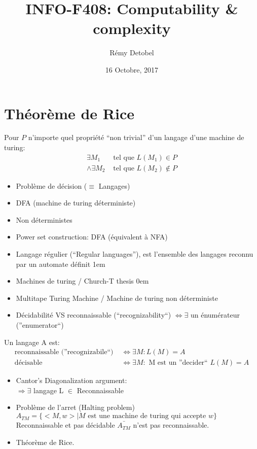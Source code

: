 \documentclass[a4paper,12pt]{article}
\title{INFO-F408: Computability \& complexity}
\date{16 Octobre, 2017}
\author{Rémy Detobel}
\begin{document}
\maketitle
\newpage

\section{Théorème de Rice}
  Pour $P$ n'importe quel propriété ``non trivial'' d'un langage d'une machine de turing:
  \begin{align*}
    \exists M_1 &\text{ tel que } L(M_1) \in P\\
    \wedge \exists M_2 &\text{ tel que } L(M_2) \notin P
  \end{align*}

  \begin{itemize}
   \item Problème de décision ($\equiv$ Langages)
   \item DFA (machine de turing déterministe)
   \item Non déterministes
   \item Power set construction: DFA (équivalent à NFA)
   \item Langage régulier (``Regular languages''), est l'ensemble des langages reconnu par un automate définit
   \itemsep1em
   \item Machines de turing / Church-T thesis
   \itemsep0em
   \item Multitape Turing Machine / Machine de turing non déterministe
   \item Décidabilité VS reconnaissable (``recognizability``) $\Leftrightarrow \exists$ un énumérateur (''enumerator``)
  \end{itemize}
  
  Un langage A est:
  \begin{align*}
    \text{reconnaissable (''recognizabile``) } &\Leftrightarrow \exists M: L(M) = A\\
    \text{décisable } &\Leftrightarrow \exists M: \text{ M est un ''decider`` } L(M) = A
  \end{align*}
  
  \begin{itemize}
    \item Cantor's Diagonalization argument:\\
      $\Rightarrow \exists$ langage L $\in$ Reconnaissable
    \item Problème de l'arret (Halting problem)\\
      $A_{TM} = \{<M, w> | M \text{ est une machine de turing qui accepte } w\}$\\
      Reconnaissable et pas décidable $\bar{A_{TM}}$ n'est pas reconnaissable.
    \item Théorème de Rice.
  \end{itemize}
\end{document}
